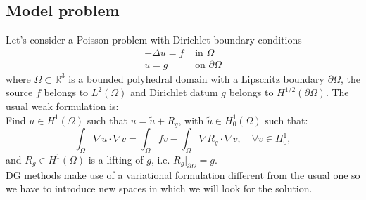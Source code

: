 \documentclass[12pt, a4paper]{article}
\theoremstyle{definition}
\theoremstyle{plain}
\theoremstyle{plain}
\begin{document}
\subsection{Model problem}
Let's consider a Poisson problem with Dirichlet boundary conditions
\begin{align} \label{eq:poisson}
	-\Delta u = f & \mbox{ in } \Omega\\
			u = g & \mbox{ on } \partial \Omega
\end{align}
where $\Omega \subset \mathbb{R}^3$ is a bounded polyhedral domain with a Lipschitz boundary $\partial \Omega$, the source $f$ belongs to $L^2(\Omega)$ and Dirichlet datum $g$ belongs to $H^{1/2}(\partial \Omega)$.
The usual weak formulation is:\\
Find $u \in H^1(\Omega)$ such that $u = \tilde{u} + R_g$, with $\tilde{u} \in H^1_0(\Omega)$ such that:
\begin{equation} \label{eq:wform}
	\int_\Omega \nabla u \cdot \nabla v
	= \int_\Omega fv - \int_\Omega \nabla R_g \cdot \nabla v, \quad \forall v \in H^1_0,
\end{equation}
and $R_g \in H^1(\Omega)$ is a lifting of $g$, i.e. $R_g|_{\partial \Omega} = g$.\\
DG methods make use of a variational formulation different from the usual one so we have to introduce new spaces in which we will look for the solution.
\end{document}
